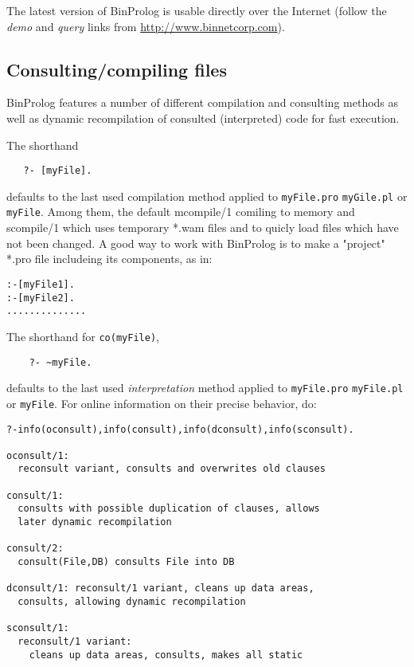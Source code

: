 \documentclass{article}
\begin{document}
The latest version of BinProlog is usable directly over the
Internet (follow the {\em demo} and {\em query} links from \url{http://www.binnetcorp.com}).

\subsection{Consulting/compiling files}

BinProlog features a number of different compilation and consulting
methods as well as dynamic recompilation of consulted (interpreted) code
for fast execution.

\noindent The shorthand

\begin{verbatim}
   ?- [myFile].
\end{verbatim}

\noindent defaults to the last used compilation method applied to
{\tt myFile.pro} {\tt myGile.pl} or {\tt myFile}. Among them,
the default mcompile/1 comiling to memory and scompile/1 which
uses temporary *.wam files and to quicly load files which have not been
changed. A good way to work with BinProlog is to make a "project" *.pro
file includeing its components, as in:

\begin{verbatim}
:-[myFile1].
:-[myFile2].
..............
\end{verbatim}

\noindent  The shorthand for {\tt co(myFile)},

\begin{verbatim}
    ?- ~myFile.
\end{verbatim}

\noindent defaults to the last used {\em interpretation} method applied to
{\tt myFile.pro} {\tt myFile.pl} or {\tt myFile}.
For online information
on their precise behavior, do:

\begin{verbatim}
?-info(oconsult),info(consult),info(dconsult),info(sconsult).

oconsult/1: 
  reconsult variant, consults and overwrites old clauses

consult/1: 
  consults with possible duplication of clauses, allows 
  later dynamic recompilation

consult/2: 
  consult(File,DB) consults File into DB

dconsult/1: reconsult/1 variant, cleans up data areas, 
  consults, allowing dynamic recompilation

sconsult/1: 
  reconsult/1 variant: 
    cleans up data areas, consults, makes all static
\end{verbatim}
\end{document}
